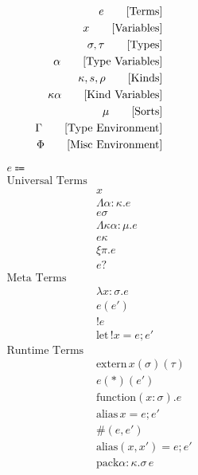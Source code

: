 \documentclass {article}
\begin{document}
\Large

\begin{align*}
e \tag* {[Terms]} \\
x \tag* {[Variables]} \\
\sigma, \tau \tag* {[Types]} \\
\alpha \tag* {[Type Variables]} \\
\kappa, s, \rho \tag* {[Kinds]} \\
\kappa \alpha \tag*{[Kind Variables]} \\
\mu \tag*{[Sorts]} \\
\Gamma \tag* {[Type Environment]} \\
\Phi \tag* {[Misc Environment]}
\end{align*}

\begin{align*}
e \Coloneqq & \\
\text{Universal Terms} \\
& x \tag*{[Variable]}\\
& \Lambda \alpha : \kappa. e \tag*{[Type Lambda]} \\
& e \sigma \tag*{[Type Application]} \\
& \Lambda \kappa \alpha : \mu. e \tag*{[Kind Lambda]} \\
& e \kappa \tag*{[Kind Application]} \\
& \xi \pi. e \tag*{[Qualified Assumption]} \\
& e? \tag*{[Qualified Check]} \\
\text{Meta Terms} \\
& \lambda x : \sigma. e \tag*{[Macro Lambda]}\\
& e(e') \tag*{[Macro Application]}\\
& !e \tag*{[Bang Introduction]} \\
& \text{let} \, !x = e; e' \tag*{[Bang Elimination]} \\ 
\text{Runtime Terms} \\
& \text{extern} \, x (\sigma) (\tau) \tag*{[Extern Symbol]} \\
& e(*)(e') \tag*{[Function Pointer Application]} \\
& \text{function} (x : \sigma). e \tag*{[Function Literal]} \\
& \text{alias} \, x = e; e' \tag*{[Runtime Let]} \\
& \#(e, e') \tag*{[Runtime Pair Introduction]} \\
& \text{alias} (x, x') = e; e' \tag*{[Runtime Pair Elimination]} \\
& \text{pack}  \alpha : \kappa. \sigma \, e \tag*{[Recursive Pack]}\\

\end{align*}
\end{document}

